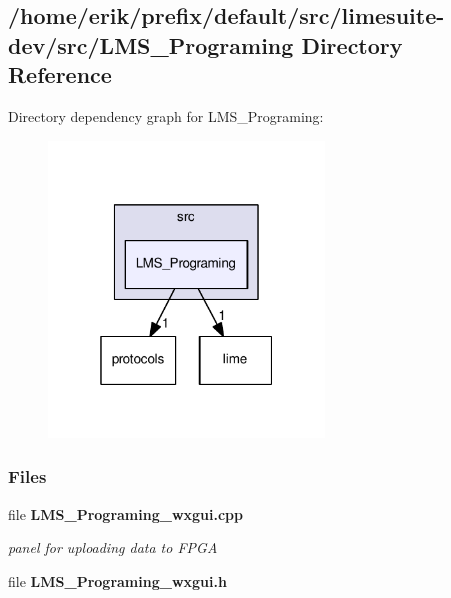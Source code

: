 \subsection{/home/erik/prefix/default/src/limesuite-\/dev/src/\+L\+M\+S\+\_\+\+Programing Directory Reference}
\label{dir_a52af8dc754c7a1d1f2a582e7db4e1ae}
Directory dependency graph for L\+M\+S\+\_\+\+Programing\+:
\nopagebreak
\begin{figure}[H]
\begin{center}
\leavevmode
\includegraphics[width=208pt]{dir_a52af8dc754c7a1d1f2a582e7db4e1ae_dep}
\end{center}
\end{figure}
\subsubsection*{Files}
\begin{DoxyCompactItemize}
\item 
file {\bf L\+M\+S\+\_\+\+Programing\+\_\+wxgui.\+cpp}
\begin{DoxyCompactList}\small\item\em panel for uploading data to F\+P\+GA \end{DoxyCompactList}\item 
file {\bf L\+M\+S\+\_\+\+Programing\+\_\+wxgui.\+h}
\end{DoxyCompactItemize}
